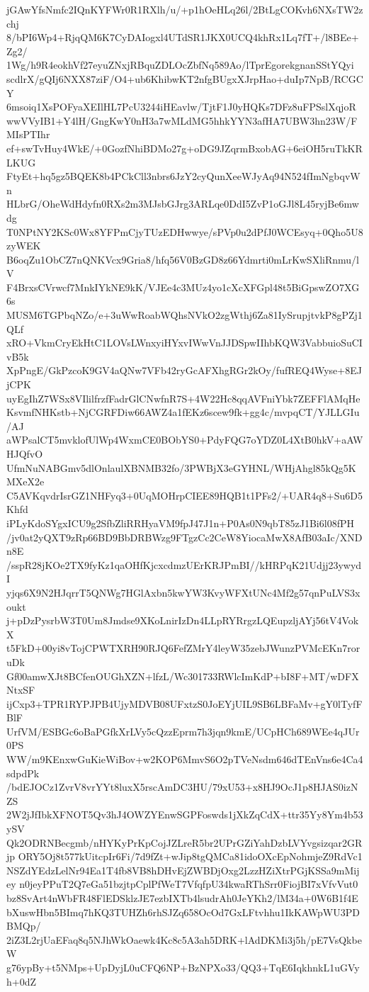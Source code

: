 jGAwYfsNmfc2IQnKYFWr0R1RXlh/u/+p1hOeHLq26l/2BtLgCOKvh6NXsTW2zchj
8/bPI6Wp4+RjqQM6K7CyDAIogxl4UTdSR1JKX0UCQ4khRx1Lq7fT+/l8BEe+Zg2/
1Wg/h9R4eokhVf27eyuZNxjRBquZDLOcZbfNq589Ao/lTprEgorekgnanSStYQyi
scdlrX/gQIj6NXX87ziF/O4+ub6KhibwKT2nfgBUgxXJrpHao+duIp7NpB/RCGCY
6msoiq1XsPOFyaXEIlHL7PcU3244iHEavlw/TjtF1J0yHQKs7DFz8uFPSslXqjoR
wwVVyIB1+Y4lH/GngKwY0nH3a7wMLdMG5hhkYYN3afHA7UBW3hn23W/FMIsPTIhr
ef+swTvHuy4WkE/+0GozfNhiBDMo27g+oDG9JZqrmBxobAG+6eiOH5ruTkKRLKUG
FtyEt+hq5gz5BQEK8b4PCkCll3nbrs6JzY2cyQunXeeWJyAq94N524fImNgbqvWn
HLbrG/OheWdHdyfn0RXs2m3MJsbGJrg3ARLqe0DdI5ZvP1oGJl8L45ryjBe6mwdg
T0NPtNY2KSc0Wx8YFPmCjyTUzEDHwwye/sPVp0u2dPfJ0WCEsyq+0Qho5U8zyWEK
B6oqZu1ObCZ7nQNKVcx9Gria8/hfq56V0BzGD8z66Ydmrti0mLrKwSXliRnmu/lV
F4BrxsCVrwcf7MnkIYkNE9kK/VJEe4c3MUz4yo1cXcXFGpl48t5BiGpswZO7XG6s
MUSM6TGPbqNZo/e+3uWwRoabWQhsNVkO2zgWthj6Za81IySrupjtvkP8gPZj1QLf
xRO+VkmCryEkHtC1LOVsLWnxyiHYxvIWwVnJJDSpwIIhbKQW3VabbuioSuCIvB5k
XpPngE/GkPzcoK9GV4aQNw7VFb42ryGcAFXhgRGr2kOy/fufREQ4Wyse+8EJjCPK
uyEgIhZ7WSx8VIlilfrzfFadrGlCNwfnR7S+4W22Hc8qqAVFniYbk7ZEFFlAMqHe
KsvmfNHKstb+NjCGRFDiw66AWZ4a1fEKz6scew9fk+gg4c/mvpqCT/YJLLGIu/AJ
aWPsalCT5mvklofUlWp4WxmCE0BObYS0+PdyFQG7oYDZ0L4XtB0hkV+aAWHJQfvO
UfmNuNABGmv5dlOnlaulXBNMB32fo/3PWBjX3eGYHNL/WHjAhgl85kQg5KMXeX2e
C5AVKqvdrIsrGZ1NHFyq3+0UqMOHrpCIEE89HQB1t1PFs2/+UAR4q8+Su6D5Khfd
iPLyKdoSYgxICU9g2SfbZliRRHyaVM9fpJ47J1n+P0As0N9qbT85zJ1Bi6l08fPH
/jv0at2yQXT9zRp66BD9BbDRBWzg9FTgzCc2CeW8YiocaMwX8AfB03aIc/XNDn8E
/sspR28jKOe2TX9fyKz1qaOHfKjcxcdmzUErKRJPmBI//kHRPqK21Udjj23ywydI
yjqs6X9N2HJqrrT5QNWg7HGlAxbn5kwYW3KvyWFXtUNc4Mf2g57qnPuLVS3xoukt
j+pDzPysrbW3T0Um8Jmdse9XKoLnirIzDn4LLpRYRrgzLQEupzljAYj56tV4VokX
t5FkD+00yi8vTojCPWTXRH90RJQ6FefZMrY4leyW35zebJWunzPVMcEKn7roruDk
Gf00amwXJt8BCfenOUGhXZN+lfzL/Wc301733RWlcImKdP+bI8F+MT/wDFXNtxSF
ijCxp3+TPR1RYPJPB4UjyMDVB08UFxtzS0JoEYjUIL9SB6LBFaMv+gY0lTyfFBlF
UrfVM/ESBGc6oBaPGfkXrLVy5cQzzEprm7h3jqn9kmE/UCpHCh689WEe4qJUr0PS
WW/m9KEnxwGuKieWiBov+w2KOP6MmvS6O2pTVeNsdm646dTEnVns6e4Ca4sdpdPk
/bdEJOCz1ZvrV8vrYYt8luxX5rscAmDC3HU/79xU53+x8HJ9OcJ1p8HJAS0izNZS
2W2jJfIbkXFNOT5Qv3hJ4OWZYEnwSGPFoswds1jXkZqCdX+ttr35Yy8Ym4b53ySV
Qk2ODRNBecgmb/nHYKyPrKpCojJZLreR5br2UPrGZiYahDzbLVYvgsizqar2GRjp
ORY5Oj8t577kUitcpIr6Fi/7d9fZt+wJip8tgQMCa81idoOXcEpNohmjeZ9RdVc1
NSZdYEdzLelNr94Ea1T4fb8VB8hDHvEjZWBDjOxg2LzzHZiXtrPGjKSSa9mMijey
n0jeyPPuT2Q7eGa51bzjtpCplPfWeT7VfqfpU34kwaRThSrr0FiojBI7xVfvVut0
bz8SvArt4nWbFR48FlEDSklzJE7ezbIXTb4lsudrAh0JeYKh2/lM34a+0W6B1f4E
bXuswHbn5BImq7hKQ3TUHZh6rhSJZq658OcOd7GxLFtvhhu1IkKAWpWU3PDBMQp/
2iZ3L2rjUaEFaq8q5NJhWkOaewk4Kc8c5A3ah5DRK+lAdDKMi3j5h/pE7VsQkbeW
g76ypBy+t5NMps+UpDyjL0uCFQ6NP+BzNPXo33/QQ3+TqE6IqkhnkL1uGVyh+0dZ
